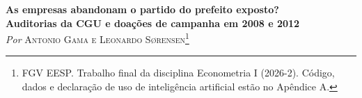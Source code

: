 \renewcommand{\ABNTEXchapterfont}{\rmfamily\bfseries}
\renewcommand{\ABNTEXsectionfontsize}{\normalsize}
\renewcommand{\ABNTEXsubsectionfont}{\rmfamily\itshape}
\renewcommand{\ABNTEXsubsectionfontsize}{\normalsize}

\captionnamefont{\small\scshape}
\captiontitlefont{\small\scshape}
\captionstyle{\centering}

\newcommand{\preencher}[1]{\textcolor{red}{[#1]}}

\newcommand{\notas}[1]{\par\vspace{4pt}\parbox{\linewidth}{\footnotesize\textit{Notas}: #1}}

\setlength{\parindent}{1.25cm}
\setlength{\parskip}{0pt}
\setlength{\abovecaptionskip}{4pt}
\setlength{\textfloatsep}{12pt plus 2pt minus 4pt}
\setlength{\intextsep}{10pt plus 2pt minus 2pt}


\frenchspacing
\textual
\pagestyle{simple}
\SingleSpacing

\begin{center}
{\Large\bfseries As empresas abandonam o partido do prefeito exposto?\\[2pt]
Auditorias da CGU e doações de campanha em 2008 e 2012}\\[14pt]
\renewcommand{\thefootnote}{*}
{\itshape Por} {\scshape Antonio Gama e Leonardo Sørensen}\footnote{FGV EESP. Trabalho final da
disciplina Econometria I (2026-2). Código, dados e declaração de uso de inteligência artificial estão no
Apêndice A.}
\end{center}
\renewcommand{\thefootnote}{\arabic{footnote}}
\setcounter{footnote}{0}

